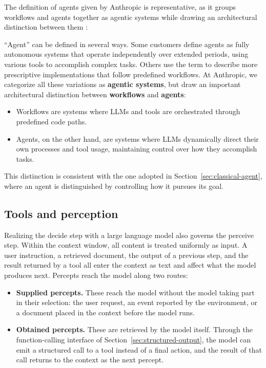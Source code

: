 The definition of agents given by Anthropic is representative, as it groups workflows and agents together as agentic systems while drawing an architectural distinction between them \cite{BuildingEffectiveAI}:

\begin{quotebox}
``Agent'' can be defined in several ways. Some customers define agents as fully autonomous systems that operate independently over extended periods, using various tools to accomplish complex tasks. Others use the term to describe more prescriptive implementations that follow predefined workflows. At Anthropic, we categorize all these variations as \textbf{agentic systems}, but draw an important architectural distinction between \textbf{workflows} and \textbf{agents}:
\begin{itemize}
	\item Workflows are systems where LLMs and tools are orchestrated through predefined code paths.
	\item Agents, on the other hand, are systems where LLMs dynamically direct their own processes and tool usage, maintaining control over how they accomplish tasks.
\end{itemize}
\end{quotebox}

This distinction is consistent with the one adopted in Section~\ref{sec:classical-agent}, where an agent is distinguished by controlling how it pursues its goal.

\subsection{Tools and perception}
\label{subsec:llm-tools-perception}

Realizing the decide step with a large language model also governs the perceive step. Within the context window, all content is treated uniformly as input. A user instruction, a retrieved document, the output of a previous step, and the result returned by a tool all enter the context as text and affect what the model produces next. Percepts reach the model along two routes:

\begin{itemize}
	\item \textbf{Supplied percepts.} These reach the model without the model taking part in their selection: the user request, an event reported by the environment, or a document placed in the context before the model runs.
	\item \textbf{Obtained percepts.} These are retrieved by the model itself. Through the function-calling interface of Section~\ref{sec:structured-output}, the model can emit a structured call to a tool instead of a final action, and the result of that call returns to the context as the next percept.
\end{itemize}

